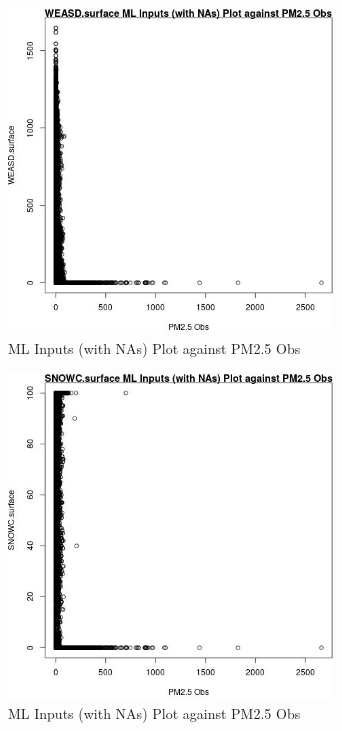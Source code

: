 \begin{figure} 
\centering  
\includegraphics[width=0.77\textwidth]{Code_Outputs/Report_ML_input_PM25_Step4_part_e_de_duplicated_aves_compiled_2019-05-20wNAs_WEASDsurfacevPM25_Obs.jpg} 
\caption{\label{fig:Report_ML_input_PM25_Step4_part_e_de_duplicated_aves_compiled_2019-05-20wNAsWEASDsurfacevPM25_Obs}ML Inputs (with NAs) Plot against PM2.5 Obs} 
\end{figure} 
 

\clearpage 

\begin{figure} 
\centering  
\includegraphics[width=0.77\textwidth]{Code_Outputs/Report_ML_input_PM25_Step4_part_e_de_duplicated_aves_compiled_2019-05-20wNAs_SNOWCsurfacevPM25_Obs.jpg} 
\caption{\label{fig:Report_ML_input_PM25_Step4_part_e_de_duplicated_aves_compiled_2019-05-20wNAsSNOWCsurfacevPM25_Obs}ML Inputs (with NAs) Plot against PM2.5 Obs} 
\end{figure} 
 

